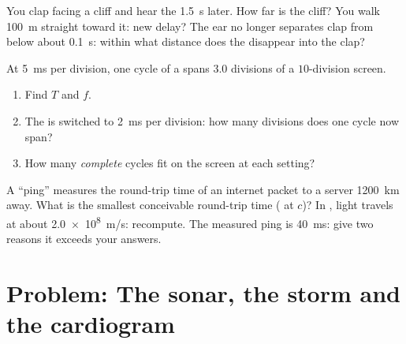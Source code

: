 \begin{exercise}[$\star\star\star$]\label{exo:g10:signals-and-waves:13}
You clap facing a cliff and hear the  \qty{1.5}{s} later. How far is
the cliff? You walk \qty{100}{m} straight toward it: new delay? The ear
no longer separates clap from  below about \qty{0.1}{s}: within what
distance does the  disappear into the clap?
\end{exercise}

\begin{exercise}[$\star\star\star$]\label{exo:g10:signals-and-waves:14}
At \qty{5}{ms} per division, one cycle of a  spans $3.0$ divisions
of a $10$-division screen.
\begin{enumerate}
  \item Find $T$ and $f$.
  \item The  is switched to \qty{2}{ms} per division: how many
        divisions does one cycle now span?
  \item How many \emph{complete} cycles fit on the screen at each
        setting?
\end{enumerate}
\end{exercise}

\begin{exercise}[$\star\star\star$]\label{exo:g10:signals-and-waves:15}
A ``ping'' measures the round-trip time of an internet packet to a
server \qty{1200}{km} away. What is the smallest conceivable round-trip
time ( at $c$)? In , light travels at about
\qty{2.0e8}{m/s}: recompute. The measured ping is \qty{40}{ms}: give two
reasons it exceeds your answers.
\end{exercise}

\section{Problem: The sonar, the storm and the cardiogram}

